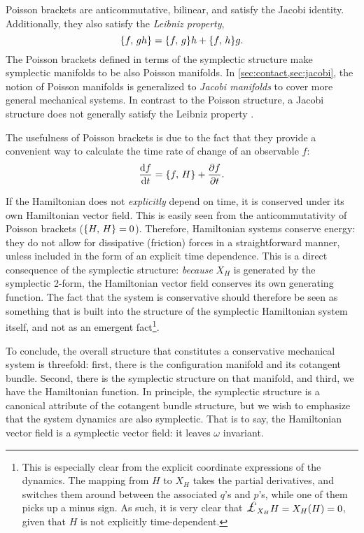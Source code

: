 Poisson brackets are anticommutative, bilinear, and satisfy the Jacobi identity. Additionally, they also satisfy the \emph{Leibniz property}, 
\begin{equation}
     \qty{f,\,gh} = \qty{f,\,g} h + \qty{f,\,h} g.
\end{equation}
The Poisson brackets defined in terms of the symplectic structure make symplectic manifolds to be also Poisson manifolds. In \cref{sec:contact,sec:jacobi}, the notion of Poisson manifolds is generalized to \emph{Jacobi manifolds} to cover more general mechanical systems. In contrast to the Poisson structure, a Jacobi structure does not generally satisfy the Leibniz property \cite{Arnold1989,Libermann1987}.

The usefulness of Poisson brackets is due to the fact that they provide a convenient way to calculate the time rate of change of an observable \(f\): 
\begin{equation}
     \dv{f}{t} = \qty{f,\,H} + \pdv{f}{t}.
\end{equation}

If the Hamiltonian does not \emph{explicitly} depend on time, it is conserved under its own Hamiltonian vector field. This is easily seen from the anticommutativity of Poisson brackets (\(\qty{H,\,H} = 0\)). Therefore, Hamiltonian systems conserve energy: they do not allow for dissipative (friction) forces in a straightforward manner, unless included in the form of an explicit time dependence. This is a direct consequence of the symplectic structure: \emph{because} \(X_H\) is generated by the symplectic 2-form, the Hamiltonian vector field conserves its own generating function. The fact that the system is conservative should therefore be seen as something that is built into the structure of the symplectic Hamiltonian system itself, and not as an emergent fact\footnote{This is especially clear from the explicit coordinate expressions of the dynamics. The mapping from \(H\) to \(X_H\) takes the partial derivatives, and switches them around between the associated \(q\)'s and \(p\)'s, while one of them picks up a minus sign. As such, it is very clear that \(\lied{X_H}{H} = X_H(H) = 0\), given that \(H\) is not explicitly time-dependent.}.

To conclude, the overall structure that constitutes a conservative mechanical system is threefold: first, there is the configuration manifold and its cotangent bundle. Second, there is the symplectic structure on that manifold, and third, we have the Hamiltonian function. In principle, the symplectic structure is a canonical attribute of the cotangent bundle structure, but we wish to emphasize that the system dynamics are also symplectic. That is to say, the Hamiltonian vector field is a symplectic vector field: it leaves \(\omega\) invariant. 


